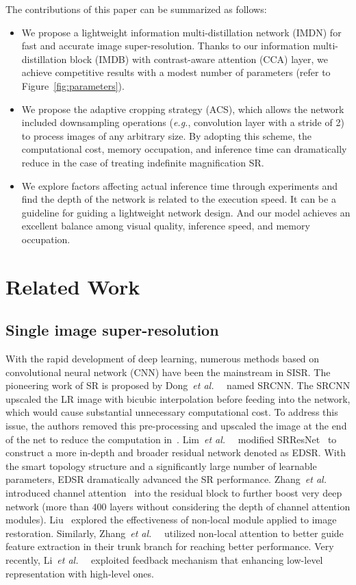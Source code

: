 \documentclass[sigconf]{acmart}
\newcommand{\etal}{\emph{et al.}~}
\newcommand{\eg}{\emph{e.g.}}
\begin{document}
The contributions of this paper can be summarized as follows:
\begin{itemize}
	\item We propose a lightweight information multi-distillation network (IMDN) for fast and accurate image super-resolution. Thanks to our information multi-distillation block (IMDB) with contrast-aware attention (CCA) layer, we achieve competitive results with a modest number of parameters (refer to Figure~\ref{fig:parameters}).
	
	\item We propose the adaptive cropping strategy (ACS), which allows the network included downsampling operations (\eg, convolution layer with a stride of 2) to process images of any arbitrary size. By adopting this scheme, the computational cost, memory occupation, and inference time can dramatically reduce in the case of treating indefinite magnification SR.
	
	\item We explore factors affecting actual inference time through experiments and find the depth of the network is related to the execution speed. It can be a guideline for guiding a lightweight network design. And our model achieves an excellent balance among visual quality, inference speed, and memory occupation.
\end{itemize}
\section{Related Work}\label{sec:related-work}
\subsection{Single image super-resolution}
With the rapid development of deep learning, numerous methods based on convolutional neural network (CNN) have been the mainstream in SISR. The pioneering work of SR is proposed by Dong~\etal~\cite{SRCNN,SRCNN-Ex} named SRCNN. The SRCNN upscaled the LR image with bicubic interpolation before feeding into the network, which would cause substantial unnecessary computational cost. To address this issue, the authors removed this pre-processing and upscaled the image at the end of the net to reduce the computation in~\cite{FSRCNN}. Lim~\etal~\cite{EDSR} modified SRResNet~\cite{SRGAN} to construct a more in-depth and broader residual network denoted as EDSR. With the smart topology structure and a significantly large number of learnable parameters, EDSR dramatically advanced the SR performance. Zhang~\etal~\cite{RDN} introduced channel attention~\cite{SENet} into the residual block to further boost very deep network (more than $400$ layers without considering the depth of channel attention modules). Liu~\cite{NLRN} explored the effectiveness of non-local module applied to image restoration. Similarly, Zhang~\etal~\cite{RNAN} utilized non-local attention to better guide feature extraction in their trunk branch for reaching better performance. Very recently, Li~\etal~\cite{feedbackSR} exploited feedback mechanism that enhancing low-level representation with high-level ones. 
\end{document}
